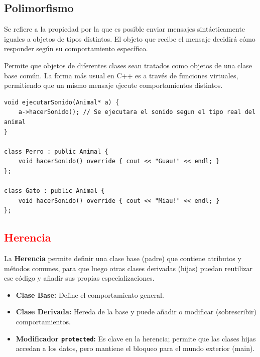 \documentclass{article}
\begin{document}
\subsection{Polimorfismo}

    Se refiere a la propiedad por la que es posible enviar mensajes
    sintácticamente iguales a objetos de tipos distintos. El objeto que
    recibe el mensaje decidirá cómo responder según su comportamiento
    específico.

    Permite que objetos de diferentes clases sean tratados como objetos
    de una clase base común. La forma más usual en C++ es a través
    de funciones virtuales, permitiendo que un mismo mensaje ejecute
    comportamientos distintos.

\begin{lstlisting}[caption=Ejemplo de Polimorfismo]
void ejecutarSonido(Animal* a) {
    a->hacerSonido(); // Se ejecutara el sonido segun el tipo real del animal
}

class Perro : public Animal {
    void hacerSonido() override { cout << "Guau!" << endl; }
};

class Gato : public Animal {
    void hacerSonido() override { cout << "Miau!" << endl; }
};
\end{lstlisting}


\textcolor{red}{\subsection{Herencia}}

    La \textbf{Herencia} permite definir una clase base (padre) que
    contiene atributos y métodos comunes, para que luego otras clases
    derivadas (hijas) puedan reutilizar ese código y añadir sus propias
    especializaciones.

\begin{itemize}
    \item \textbf{Clase Base:} Define el comportamiento general.
    \item \textbf{Clase Derivada:} Hereda de la base y puede añadir o modificar (sobrescribir) comportamientos.
    \item \textbf{Modificador \texttt{protected}:} Es clave en la herencia; permite que las clases hijas accedan a los datos, pero mantiene el bloqueo para el mundo exterior (main).
\end{itemize}
\end{document}

